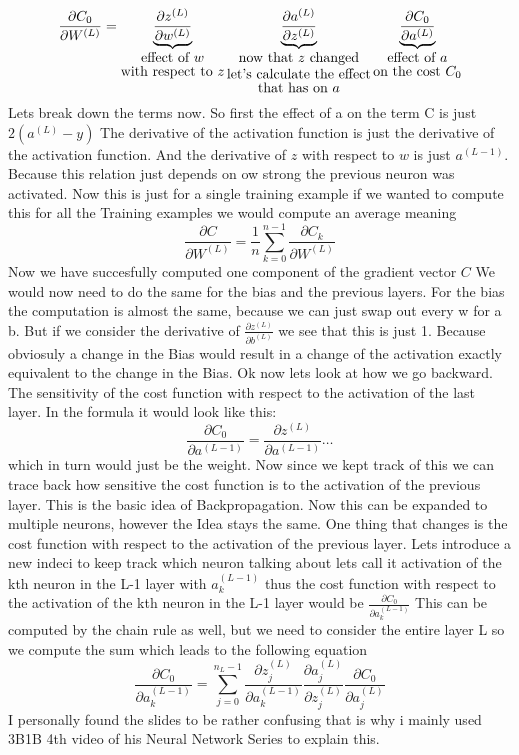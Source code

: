 \documentclass[a4paper]{article}
\begin{document}
\[
\frac{\partial C_{0}}{\partial W^{(L)}} = \underbrace{\frac{\partial z^{(L)}}{\partial w^{(L)}}}_{\shortstack{effect of \( w \) \\ with respect to \( z \)}} \underbrace{\frac{\partial a^{(L)}}{\partial z^{(L)}}}_{\shortstack{now that \( z \) changed \\ let's calculate the effect \\ that has on \( a \)}} \underbrace{\frac{\partial C_{0}}{\partial a^{(L)}}}_{\shortstack{effect of \( a \) \\ on the cost \( C_{0} \)}}
\]
Lets break down the terms now. So first the effect of a on the term C is just $2(a^{(L)} - y)$ The derivative of the activation function is just the derivative of the activation function. And the derivative of $z$ with respect to $w$ is just $a^{(L-1)}$. Because this relation just depends on ow strong the previous neuron was activated. Now this is just for a single training example if we wanted to compute this for 
all the Training examples we would compute an average meaning $$\frac{\partial C}{\partial W^{(L)}} = \frac{1}{n} \sum_{k = 0}^{n-1} \frac{\partial C_{k}}{\partial W^{(L)}}$$ Now we have succesfully computed one component of the gradient vector $C$ We would now need to do the same for the bias and the previous layers. For the bias the computation 
is almost the same, because we can just swap out every w for a b. But if we consider the derivative of $\frac{\partial z^{(L)}}{\partial b^{(L)}}$ we see that this is just 1. Because obviosuly a change in the Bias would result in a change of the activation exactly equivalent to the change in the Bias. Ok now lets look at how we go backward. The sensitivity of the cost function with respect to the activation of the last layer. In the formula it would look like this: \[ \frac{\partial C_{0}}{\partial a^{(L-1)}} = \frac{\partial z^{(L)}}{\partial a^{(L-1)}} \dots \] which in turn would just be the weight. Now since we kept track 
of this we can trace back how sensitive the cost function is to the activation of the previous layer. This is the basic idea of Backpropagation. Now this can be expanded to multiple neurons, however the Idea stays the same. One thing that changes is the cost function with respect to the activation of the previous layer. Lets introduce a new indeci to keep track which neuron talking about lets call it activation of the kth neuron in the L-1 layer with $a_k^{(L-1)}$ 
thus the cost function with respect to the activation of the kth neuron in the L-1 layer would be $\frac{\partial C_{0}}{\partial a_k^{(L-1)}}$ This can be computed by the chain rule as well, but we need to consider the entire layer L so we compute the sum which leads to the following equation $$ \frac{\partial C_{0}}{\partial a_k^{(L-1)}} = \sum_{j=0}^{n_{L}-1} \frac{\partial z_{j}^{(L)}}{\partial a_k^{(L-1)}} \frac{\partial a_j^{(L)}}{\partial z_j^{(L)}} \frac{\partial C_{0}}{\partial a_j^{(L)}}$$ 
I personally found the slides to be rather confusing that is why i mainly used 3B1B 4th video of his Neural Network Series to explain this.
\end{document}
